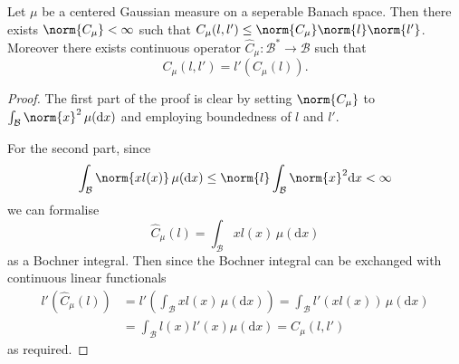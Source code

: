 \documentclass[fontsize=12pt, DIV=12]{scrreprt}
\newcommand{\calB}{\mathcal B}
\newcommand{\dif}[1]{\text{d} #1}
\begin{document}
\begin{prop}
	\label{prop:bounded-cov}
	Let $\mu$ be a centered Gaussian measure on a seperable Banach space. Then there exists $\norm{C_{\mu}} < \infty$ such that $C_{\mu}(l, l') \leq \norm{C_{\mu}} \norm{l} \norm{l'}$. Moreover there exists continuous operator $\hat{C}_{\mu}: \calB^* \to \calB$ such that
	\begin{equation}
		C_{\mu}(l, l') = l'\left(C_{\mu}(l) \right).
	\end{equation}
\end{prop}
\begin{proof}
	The first part of the proof is clear by setting $\norm{C_{\mu}}$ to $\int_{\calB} \norm{x}^2 \, \mu(\dif x)$ and employing boundedness of $l$ and $l'$.

	For the second part, since
	\begin{equation}
		\int_{\calB} \norm{x l(x)} \, \mu(\dif x) \leq \norm{l} \int_{\calB} \norm{x}^2 \dif x < \infty
	\end{equation}
	we can formalise
	\begin{equation}
		\hat{C}_{\mu}(l) = \int_{\calB} x l(x) \, \mu(\dif x)
	\end{equation}
	as a Bochner integral. Then since the Bochner integral can be exchanged with continuous linear functionals
	\begin{align}
		l'(\hat{C}_{\mu}(l))
		&= l' \left( \int_{\calB} x l(x) \, \mu(\dif x)\right)
		= \int_{\calB} l'(x l(x)) \, \mu(\dif x) \nonumber \\
		&= \int_{\calB} l(x) l'(x) \mu(\dif x)
		= C_{\mu}(l, l')
	\end{align}
	as required.
\end{proof}
\end{document}
